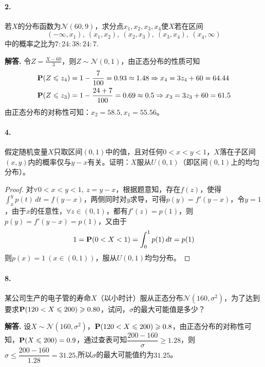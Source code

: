 \documentclass[12pt, a4paper, oneside]{ctexart}
\newenvironment{solution}{\par\noindent\textbf{解答. }}{\bigskip\par}
\begin{document}
\paragraph{2.}若$X$的分布函数为$\mathcal{N}(60,9)$，求分点$x_1,x_2,x_3,x_4$使$X$若在区间\begin{equation*}
    (-\infty, x_1),\ (x_1,x_2),\ (x_2, x_3),\ (x_3, x_4),\ (x_4,\infty)
\end{equation*}
中的概率之比为$7:24:38:24:7.$
\begin{solution}
    令$Z = \frac{X - 60}{3}$，则$Z\sim \mathcal{N}(0,1)$，由正态分布的性质可知
    \begin{equation*}
        \begin{aligned}
            &\P(Z\leqslant z_4) = 1-\frac{7}{100} = 0.93 \approx 1.48\Rightarrow x_4 = 3z_4+60 = 64.44\\
            &\P(Z\leqslant z_3) = 1-\frac{24+7}{100} = 0.69\approx 0.5\Rightarrow x_3 = 3z_3+60 = 61.5
        \end{aligned}
    \end{equation*}
    由正态分布的对称性可知：$x_2 = 58.5, x_1 = 55.56$。
\end{solution}
\paragraph{4.}假定随机变量$X$只取区间$(0,1)$中的值，且对任何$0<x<y<1$，$X$落在子区间$(x,y)$内的概率仅与$y-x$有关。证明：$X$服从$U(0,1)$（即区间$(0,1)$上的均匀分布）。
\begin{proof}
    对$\forall 0<x<y<1,\ z = y-x$，根据题意知，存在$f(z)$，使得$\displaystyle \int_x^yp(t)\,dt = f(y-x)$，两侧同时对$y$求导，可得$p(y) = f'(y-x)$，令$y=1$，由于$x$的任意性，$\forall z\in (0,1)$，都有$f'(z) = p(1)$，则$p(y) = f'(y-x) = p(1)$，又由于
    \begin{equation*}
        1=\P(0<X<1)=\int_0^1p(1)\,dt = p(1)
    \end{equation*}
    则$p(x) = 1\ (x\in (0,1))$，服从$U(0,1)$均匀分布。
\end{proof}
\paragraph{8.}某公司生产的电子管的寿命$X$（以小时计）服从正态分布$\mathcal{N}(160,\sigma^2)$，为了达到要求\newline$\P(120<X\leqslant 200)\geqslant 0.80$，试问，$\sigma$的最大可能值是多少？
\begin{solution}
    设$X\sim \mathcal{N}(160,\sigma^2)$，$\P(120<X\leqslant 200)\geqslant 0.8$，由正态分布的对称性可知，$\P(X\leqslant 200) = 0.9$，通过查表可知$\dfrac{200-160}{\sigma}\geqslant 1.28$，则$\sigma \leqslant \dfrac{200-160}{1.28} = 31.25$,所以$\sigma$的最大可能值约为$31.25$。
\end{solution}
\end{document}
